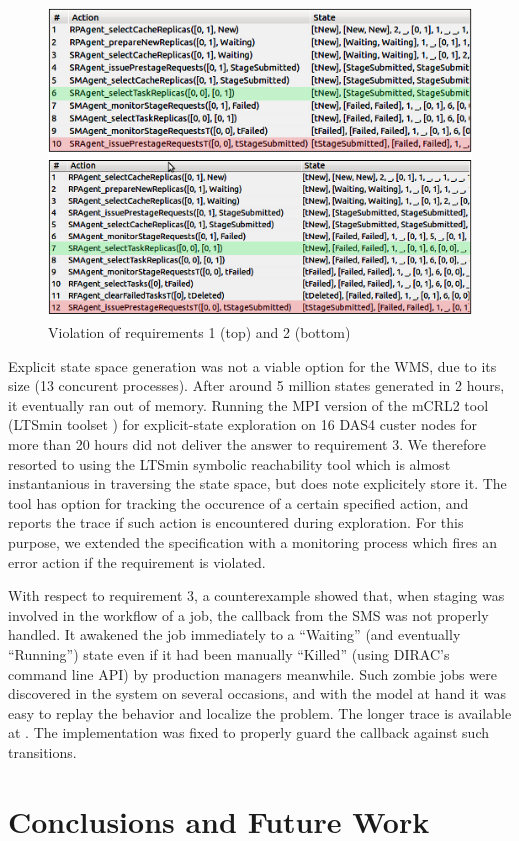 \documentclass[10pt,conference]{IEEEtran}
\begin{document}
\begin{figure}[!b]
\includegraphics[width=1\linewidth,keepaspectratio=true]{./PropertyViolation.png}

\centering
\caption{Violation of requirements 1 (top) and 2 (bottom)}
\label{fig:PropertyViolation}
\end{figure}

Explicit state space generation was not a viable option for the WMS, due to its size (13 concurent processes).
After around 5 million states generated in 2 hours, it eventually ran out of memory.
Running the MPI version of the mCRL2 tool (LTSmin toolset \cite{LTSmin}) for explicit-state exploration on 16 DAS4 \cite{DAS4} custer nodes
for more than 20 hours did not deliver the answer to requirement 3.
We therefore resorted to using the LTSmin symbolic reachability tool which 
is almost instantanious in traversing the state space, but does note
explicitely store it.
The tool has option for tracking the occurence of a certain specified action, and
reports the trace if such action is encountered during exploration. 
For this purpose, we extended the specification 
with a monitoring process which fires an error action if the requirement is
violated.

With respect to requirement 3, a counterexample showed that, when 
staging was involved in the workflow of a job, the callback from
the SMS was not properly handled.
It awakened the job immediately to a ``Waiting'' (and eventually ``Running'') state
even if it had been manually ``Killed'' 
(using DIRAC's command line API) by production managers meanwhile. Such zombie jobs
were discovered in the system on several occasions,
and with the model at hand it was easy to replay the behavior and localize the
problem. The longer trace is available at \cite{svn_mcrl2}. The implementation
was fixed to properly guard the callback against such transitions.


\section{Conclusions and Future Work}
\label{sec:Section_5}

\lipsum[1-2]

 

\end{document}
